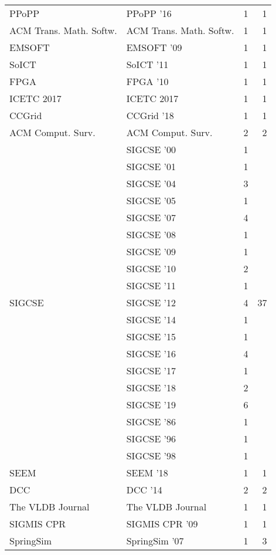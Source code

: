 \begin{table*}[t]
\begin{tabular}{llrr}
\multirow{1}{*}{PPoPP } & PPoPP '16 & 1 & \multirow{1}{*}{1}\\
\multirow{1}{*}{ACM Trans. Math. Softw.} & ACM Trans. Math. Softw. & 1 & \multirow{1}{*}{1}\\
\multirow{1}{*}{EMSOFT } & EMSOFT '09 & 1 & \multirow{1}{*}{1}\\
\multirow{1}{*}{SoICT } & SoICT '11 & 1 & \multirow{1}{*}{1}\\
\multirow{1}{*}{FPGA } & FPGA '10 & 1 & \multirow{1}{*}{1}\\
\multirow{1}{*}{ICETC 2017} & ICETC 2017 & 1 & \multirow{1}{*}{1}\\
\multirow{1}{*}{CCGrid } & CCGrid '18 & 1 & \multirow{1}{*}{1}\\
\multirow{1}{*}{ACM Comput. Surv.} & ACM Comput. Surv. & 2 & \multirow{1}{*}{2}\\
\multirow{19}{*}{SIGCSE } & SIGCSE '00 & 1 & \multirow{19}{*}{37}\\
& SIGCSE '01 & 1 &\\
& SIGCSE '04 & 3 &\\
& SIGCSE '05 & 1 &\\
& SIGCSE '07 & 4 &\\
& SIGCSE '08 & 1 &\\
& SIGCSE '09 & 1 &\\
& SIGCSE '10 & 2 &\\
& SIGCSE '11 & 1 &\\
& SIGCSE '12 & 4 &\\
& SIGCSE '14 & 1 &\\
& SIGCSE '15 & 1 &\\
& SIGCSE '16 & 4 &\\
& SIGCSE '17 & 1 &\\
& SIGCSE '18 & 2 &\\
& SIGCSE '19 & 6 &\\
& SIGCSE '86 & 1 &\\
& SIGCSE '96 & 1 &\\
& SIGCSE '98 & 1 &\\
\multirow{1}{*}{SEEM } & SEEM '18 & 1 & \multirow{1}{*}{1}\\
\multirow{1}{*}{DCC } & DCC '14 & 2 & \multirow{1}{*}{2}\\
\multirow{1}{*}{The VLDB Journal} & The VLDB Journal & 1 & \multirow{1}{*}{1}\\
\multirow{1}{*}{SIGMIS CPR } & SIGMIS CPR '09 & 1 & \multirow{1}{*}{1}\\
\multirow{3}{*}{SpringSim } & SpringSim '07 & 1 & \multirow{3}{*}{3}\\

\end{tabular}
\end{table*}
